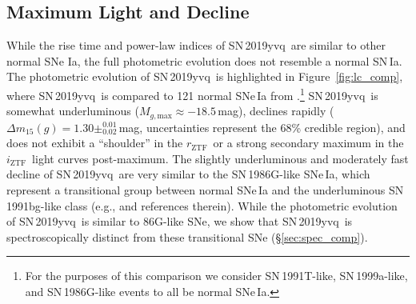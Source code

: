 \documentclass[twocolumn]{aastex63}
\newcommand{\rztf}{$r_\mathrm{ZTF}$}
\newcommand{\iztf}{$i_\mathrm{ZTF}$}
\newcommand{\sn}{SN\,2019yvq}
\begin{document}
\subsection{Maximum Light and Decline}\label{sec:max_decline}

While the rise time and power-law indices of \sn\ are similar to other normal
SNe Ia, the full photometric evolution does not resemble a normal SN\,Ia. The
photometric evolution of \sn\ is highlighted in Figure~\ref{fig:lc_comp},
where \sn\ is compared to 121 normal SNe\,Ia from \citet{Yao19}.\footnote{For
the purposes of this comparison we consider SN\,1991T-like, SN\,1999a-like,
and SN\,1986G-like events to all be normal SNe\,Ia.} \sn\ is somewhat
underluminous ($M_{g,\mathrm{max}} \approx -18.5$\,mag), declines rapidly
($\Delta m_{15}(g) = 1.30\pm^{0.01}_{0.02}$\,mag, uncertainties represent the
68\% credible region), and does not exhibit a ``shoulder'' in the \rztf\ or a
strong secondary maximum in the \iztf\ light curves post-maximum. The slightly
underluminous and moderately fast decline of \sn\ are very similar to the
SN\,1986G-like SNe\,Ia, which represent a transitional group between normal
SNe\,Ia and the underluminous SN\,1991bg-like class (e.g.,
\citealt{Taubenberger17} and references therein). While the photometric
evolution of \sn\ is similar to 86G-like SNe, we show that \sn\ is
spectroscopically distinct from these transitional SNe
(\S\ref{sec:spec_comp}).
\end{document}
